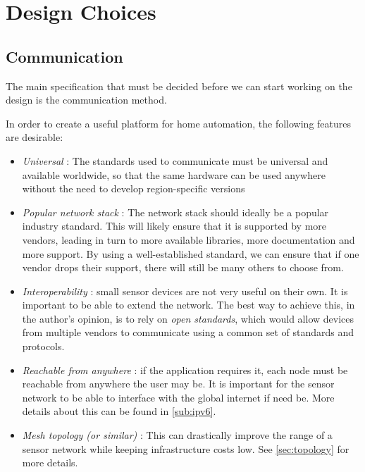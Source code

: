 \chapter{Design Choices}\label{ch:choices}

\section{Communication}\label{sec:communication}

The main specification that must be decided before we can start working on the
design is the communication method.


In order to create a useful platform for home automation, the following features
are desirable:

\begin{itemize}
  \item \emph{Universal} :
    The standards used to communicate must be universal and available worldwide,
    so that the same hardware can be used anywhere without the need to develop
    region-specific versions

  \item \emph{Popular network stack} : 
    The network stack should ideally be a popular industry standard. This will
    likely ensure that it is supported by more vendors, leading in turn to more
    available libraries, more documentation and more support. By using
    a well-established standard, we can ensure that if one vendor drops their
    support, there will still be many others to choose from.

  \item \emph{Interoperability} : small sensor devices are not very useful on
    their own. It is important to be able to extend the network. The best way to
    achieve this, in the author's opinion, is to rely on \emph{open standards},
    which would allow devices from multiple vendors to communicate using
    a common set of standards and protocols. 

  \item \emph{Reachable from anywhere} : if the application requires it, each
    node must be reachable from anywhere the user may be. It is important for
    the sensor network to be able to interface with the global internet if need
    be. More details about this can be found in \autoref{sub:ipv6}.

  \item \emph{Mesh topology (or similar)} : This can drastically improve the
    range of a sensor network while keeping infrastructure costs low. See
    \autoref{sec:topology} for more details.
\end{itemize}



